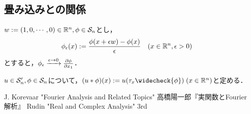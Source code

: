 \documentclass[uplatex,dvipdfmx]{jsreport}
\begin{document}
\subsection{畳み込みとの関係}

\begin{lemma}[Schwartz空間での収束の特徴付け]
    $w:=(1,0,\cdots,0)\in\R^n,\phi\in\S_n$とし，
    \[\phi_\ep(x):=\frac{\phi(x+\ep w)-\phi(x)}{\ep}\quad(x\in\R^n,\ep>0)\]
    とすると，$\phi_\ep\xrightarrow{\ep\to0}\pp{\phi}{x_1}$．
\end{lemma}

\begin{definition}
    $u\in\S'_n,\phi\in\S_n$について，$(u*\phi)(x):=u(\tau_x\widecheck{\phi})\;(x\in\R^n)$と定める．
\end{definition}

\begin{thebibliography}{9}
    J. Korevaar "Fourier Analysis and Related Topics"
    高橋陽一郎『実関数とFourier解析』
    Rudin "Real and Complex Analysis" 3rd
\end{thebibliography}
\end{document}

